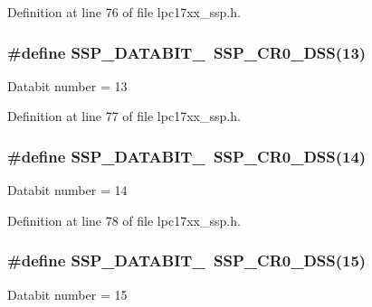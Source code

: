 \-Definition at line 76 of file lpc17xx\-\_\-ssp.\-h.

\hypertarget{group___s_s_p___public___macros_ga6e7696139bcc6ffbea4c7633db5691bc}{
\subsubsection[{\-S\-S\-P\-\_\-\-D\-A\-T\-A\-B\-I\-T\-\_\-13}]{\setlength{\rightskip}{0pt plus 5cm}\#define {\bf \-S\-S\-P\-\_\-\-D\-A\-T\-A\-B\-I\-T\-\_}~{\bf \-S\-S\-P\-\_\-\-C\-R0\-\_\-\-D\-S\-S}(13)}}\label{group___s_s_p___public___macros_ga6e7696139bcc6ffbea4c7633db5691bc}
\-Databit number = 13 

\-Definition at line 77 of file lpc17xx\-\_\-ssp.\-h.

\hypertarget{group___s_s_p___public___macros_ga23092c43aa47e79b5c540e1c8bcfb43f}{
\subsubsection[{\-S\-S\-P\-\_\-\-D\-A\-T\-A\-B\-I\-T\-\_\-14}]{\setlength{\rightskip}{0pt plus 5cm}\#define {\bf \-S\-S\-P\-\_\-\-D\-A\-T\-A\-B\-I\-T\-\_}~{\bf \-S\-S\-P\-\_\-\-C\-R0\-\_\-\-D\-S\-S}(14)}}\label{group___s_s_p___public___macros_ga23092c43aa47e79b5c540e1c8bcfb43f}
\-Databit number = 14 

\-Definition at line 78 of file lpc17xx\-\_\-ssp.\-h.

\hypertarget{group___s_s_p___public___macros_gafb96efb2ad42b6804003beb416bf513f}{
\subsubsection[{\-S\-S\-P\-\_\-\-D\-A\-T\-A\-B\-I\-T\-\_\-15}]{\setlength{\rightskip}{0pt plus 5cm}\#define {\bf \-S\-S\-P\-\_\-\-D\-A\-T\-A\-B\-I\-T\-\_}~{\bf \-S\-S\-P\-\_\-\-C\-R0\-\_\-\-D\-S\-S}(15)}}\label{group___s_s_p___public___macros_gafb96efb2ad42b6804003beb416bf513f}
\-Databit number = 15 

